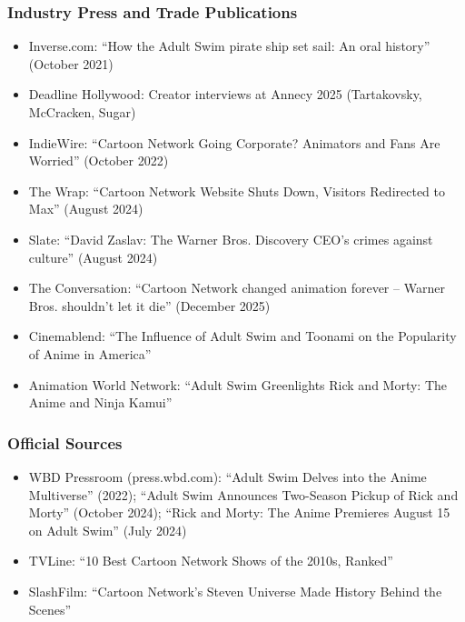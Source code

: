 \documentclass[11pt,letterpaper]{article}
\newcommand{\stageheader}[2]{%
  \noindent\colorbox{#2}{\makebox[\textwidth][l]{%
    \textcolor{white}{\bfseries\sffamily\hspace{6pt}#1\hspace{6pt}}}}%
  \vspace{0.5em}\par%
}
\begin{document}
\subsubsection{Industry Press and Trade Publications}
\begin{itemize}
  \item Inverse.com: ``How the Adult Swim pirate ship set sail: An oral history'' (October 2021)
  \item Deadline Hollywood: Creator interviews at Annecy 2025 (Tartakovsky, McCracken, Sugar)
  \item IndieWire: ``Cartoon Network Going Corporate? Animators and Fans Are Worried'' (October 2022)
  \item The Wrap: ``Cartoon Network Website Shuts Down, Visitors Redirected to Max'' (August 2024)
  \item Slate: ``David Zaslav: The Warner Bros. Discovery CEO's crimes against culture'' (August 2024)
  \item The Conversation: ``Cartoon Network changed animation forever -- Warner Bros. shouldn't let it die'' (December 2025)
  \item Cinemablend: ``The Influence of Adult Swim and Toonami on the Popularity of Anime in America''
  \item Animation World Network: ``Adult Swim Greenlights Rick and Morty: The Anime and Ninja Kamui''
\end{itemize}

\subsubsection{Official Sources}
\begin{itemize}
  \item WBD Pressroom (press.wbd.com): ``Adult Swim Delves into the Anime Multiverse'' (2022); ``Adult Swim Announces Two-Season Pickup of Rick and Morty'' (October 2024); ``Rick and Morty: The Anime Premieres August 15 on Adult Swim'' (July 2024)
  \item TVLine: ``10 Best Cartoon Network Shows of the 2010s, Ranked''
  \item SlashFilm: ``Cartoon Network's Steven Universe Made History Behind the Scenes''
\end{itemize}

\newpage
\stageheader{STAGE 3 --- MISSION PACKAGE}{tertiary}
\end{document}
